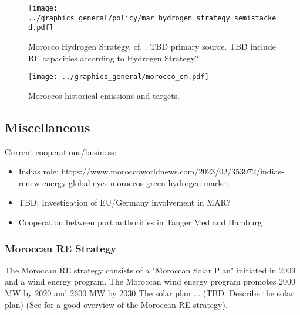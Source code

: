 \begin{figure}
    \centering
    \texttt{[image: ../graphics\_general/policy/mar\_hydrogen\_strategy\_semistacked.pdf]}
    \caption{Morocco Hydrogen Strategy, cf. \cite[p. 14]{Ersoy2022}. TBD primary source. TBD include RE capacities according to Hydrogen Strategy?}
    \label{fig:mar_hydrogen_strategy}
\end{figure}




\begin{figure}[h!]
    \centering
    \texttt{[image: ../graphics\_general/morocco\_em.pdf]}
    \caption{Moroccos historical emissions and targets.}
    \label{fig:morocco_em}
\end{figure}


\subsection{Miscellaneous}

Current cooperations/business:
\begin{itemize}
    \item Indias role: https://www.moroccoworldnews.com/2023/02/353972/indias-renew-energy-global-eyes-moroccos-green-hydrogen-market
    \item TBD: Investigation of EU/Germany involvement in MAR?
    \item Cooperation between port authorities in Tanger Med and Hamburg
\end{itemize}

\subsubsection{Moroccan RE Strategy}
The Moroccan RE strategy consists of a "Moroccan Solar Plan" initiated in 2009 \cite[p. 2]{Boulakhbar2020}
and a wind energy program.
The Moroccan wind energy program promotes 2000 MW by 2020 and 2600 MW by 2030 \cite[p. 4]{Boulakhbar2020}
The solar plan ... (TBD: Describe the solar plan)
(See \cite[p. 13]{Ersoy2022} for a good overview of the Moroccan RE strategy).